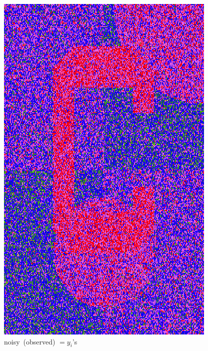 \documentclass[12pt]{beamer}
\begin{document}
\begin{frame}
\begin{center}
\begin{minipage}[t]{0.2\textwidth}
\includegraphics[width=\textwidth]{c_noisy.png} \\
{\small \mbox{noisy (observed)} $= y_i$'s}
\end{minipage}
\hfill
\begin{minipage}[t]{0.2\textwidth}

\end{minipage}
\end{center}
\end{frame}
\end{document}
